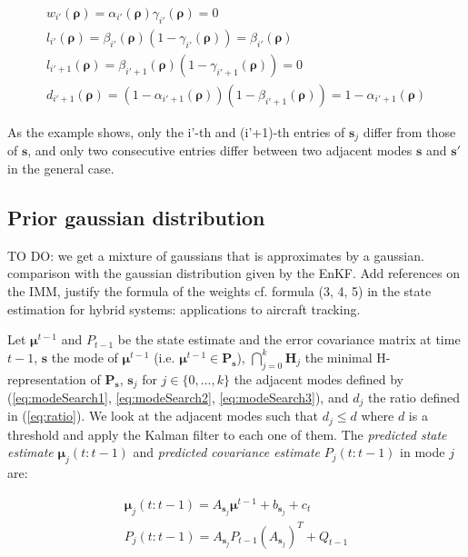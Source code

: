 \begin{equation}
\begin{array}{l}
w_{i'}(\boldsymbol\rho)=\alpha_{i'}(\boldsymbol\rho)\gamma_{i'}(\boldsymbol\rho)=0\\
l_{i'}(\boldsymbol\rho)=\beta_{i'}(\boldsymbol\rho)(1-\gamma_{i'}(\boldsymbol\rho))=\beta_{i'}(\boldsymbol\rho)\\
l_{i'+1}(\boldsymbol\rho)=\beta_{i'+1}(\boldsymbol\rho)(1-\gamma_{i'+1}(\boldsymbol\rho))=0\\
d_{i'+1}(\boldsymbol\rho)=(1-\alpha_{i'+1}(\boldsymbol\rho))(1-\beta_{i'+1}(\boldsymbol\rho))=1-\alpha_{i'+1}(\boldsymbol\rho)
\end{array}
\label{eq:modeSearch8}
\end{equation}

As the example shows, only the i'-th and (i'+1)-th entries of $\boldsymbol s_{j}$ differ from those of $\boldsymbol s$, and only two consecutive entries differ between two adjacent modes $\boldsymbol s$ and $\boldsymbol s'$ in the general case.


\subsection{Prior gaussian distribution}

TO DO: we get a mixture of gaussians that is approximates by a gaussian. comparison with the gaussian distribution given by the EnKF. Add references on the IMM, justify the formula of the weights cf. formula (3, 4, 5) in the state estimation for hybrid systems: applications to aircraft tracking.

Let $\boldsymbol\mu^{t-1}$ and $P_{t-1}$ be the state estimate and the error covariance matrix at time $t-1$, $\boldsymbol s$ the mode of $\boldsymbol\mu^{t-1}$ (i.e. $\boldsymbol\mu^{t-1}\in \textbf{P}_{\boldsymbol s}$), $\bigcap_{j=0}^{k} \textbf{H}_{j}$ the minimal H-representation of $\textbf{P}_{\boldsymbol s}$, $\boldsymbol s_{j}$ for $j\in\{0,...,k\}$ the adjacent modes defined by (\ref{eq:modeSearch1}, \ref{eq:modeSearch2}, \ref{eq:modeSearch3}), and $d_{j}$ the ratio defined in (\ref{eq:ratio}). We look at the adjacent modes such that $d_{j}\leq d$ where $d$ is a threshold and apply the Kalman filter to each one of them. The \emph{predicted state estimate} $\boldsymbol\mu_{j}(t:t-1)$ and \emph{predicted covariance estimate} $P_{j}(t:t-1)$ in mode $j$ are:

\begin{equation}
\begin{array}{ll}
\boldsymbol\mu_{j}(t:t-1) = A_{\boldsymbol s_{j}} \boldsymbol\mu^{t-1} + b_{\boldsymbol s_{j}} + c_{t}\\
P_{j}(t:t-1) = A_{\boldsymbol s_{j}}P_{t-1}(A_{\boldsymbol s_{j}})^{T} + Q_{t-1}
\end{array}
\label{eq:mixture1}
\end{equation}

